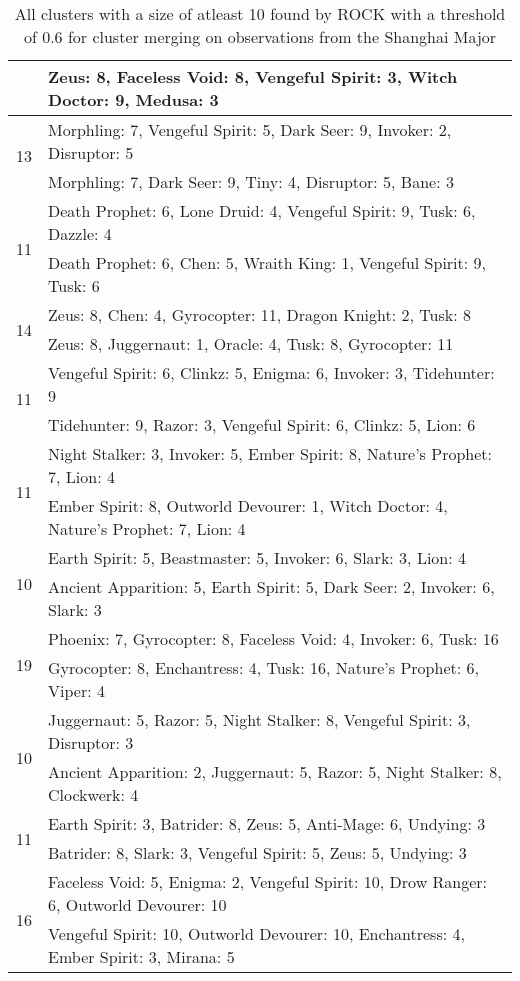 \documentclass[result.tex]{subfiles}
\begin{document}
\begin{table}[H]
\begin{tabular}{ | c | p{12.5cm} | }
    & Zeus: 8, Faceless Void: 8, Vengeful Spirit: 3, Witch Doctor: 9, Medusa: 3 \\
    \hline
    \multirow{2}{*}{13}
    & Morphling: 7, Vengeful Spirit: 5, Dark Seer: 9, Invoker: 2, Disruptor: 5 \\
    & Morphling: 7, Dark Seer: 9, Tiny: 4, Disruptor: 5, Bane: 3 \\
    \hline
    \multirow{2}{*}{11}
    & Death Prophet: 6, Lone Druid: 4, Vengeful Spirit: 9, Tusk: 6, Dazzle: 4 \\
    & Death Prophet: 6, Chen: 5, Wraith King: 1, Vengeful Spirit: 9, Tusk: 6 \\
    \hline
    \multirow{2}{*}{14}
    & Zeus: 8, Chen: 4, Gyrocopter: 11, Dragon Knight: 2, Tusk: 8 \\
    & Zeus: 8, Juggernaut: 1, Oracle: 4, Tusk: 8, Gyrocopter: 11 \\
    \hline
    \multirow{2}{*}{11}
    & Vengeful Spirit: 6, Clinkz: 5, Enigma: 6, Invoker: 3, Tidehunter: 9 \\
    & Tidehunter: 9, Razor: 3, Vengeful Spirit: 6, Clinkz: 5, Lion: 6 \\
    \hline
    \multirow{2}{*}{11}
    & Night Stalker: 3, Invoker: 5, Ember Spirit: 8, Nature's Prophet: 7, Lion: 4 \\
    & Ember Spirit: 8, Outworld Devourer: 1, Witch Doctor: 4, Nature's Prophet: 7, Lion: 4 \\
    \hline
    \multirow{2}{*}{10}
    & Earth Spirit: 5, Beastmaster: 5, Invoker: 6, Slark: 3, Lion: 4 \\
    & Ancient Apparition: 5, Earth Spirit: 5, Dark Seer: 2, Invoker: 6, Slark: 3 \\
    \hline
    \multirow{2}{*}{19}
    & Phoenix: 7, Gyrocopter: 8, Faceless Void: 4, Invoker: 6, Tusk: 16 \\
    & Gyrocopter: 8, Enchantress: 4, Tusk: 16, Nature's Prophet: 6, Viper: 4 \\
    \hline
    \multirow{2}{*}{10}
    & Juggernaut: 5, Razor: 5, Night Stalker: 8, Vengeful Spirit: 3, Disruptor: 3 \\
    & Ancient Apparition: 2, Juggernaut: 5, Razor: 5, Night Stalker: 8, Clockwerk: 4 \\
    \hline
    \multirow{2}{*}{11}
    & Earth Spirit: 3, Batrider: 8, Zeus: 5, Anti-Mage: 6, Undying: 3 \\
    & Batrider: 8, Slark: 3, Vengeful Spirit: 5, Zeus: 5, Undying: 3 \\
    \hline
    \multirow{2}{*}{16}
    & Faceless Void: 5, Enigma: 2, Vengeful Spirit: 10, Drow Ranger: 6, Outworld Devourer: 10 \\
    & Vengeful Spirit: 10, Outworld Devourer: 10, Enchantress: 4, Ember Spirit: 3, Mirana: 5 \\
    \hline
  \end{tabular}
  \caption{All clusters with a size of atleast 10 found by ROCK with a threshold of 0.6 for cluster merging on observations from the Shanghai Major}
  \label{tab:cl_shanghai_rock_all}
\end{table}
\end{document}
